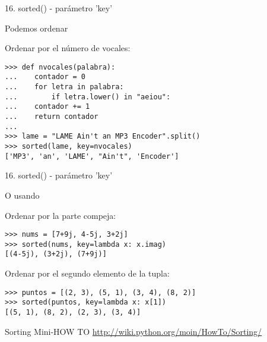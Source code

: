 \begin{frame}[fragile]{16. sorted() - parámetro 'key'}
  \begin{block}{}
    \centering
    Podemos ordenar 
  \end{block}

  \footnotesize
  \begin{exampleblock}
    {Ordenar por el número de vocales:}
    \begin{lstlisting}
>>> def nvocales(palabra):
...    contador = 0
...    for letra in palabra:
...        if letra.lower() in "aeiou":
...	   contador += 1
...    return contador
...
>>> lame = "LAME Ain't an MP3 Encoder".split()
>>> sorted(lame, key=nvocales)
['MP3', 'an', 'LAME', "Ain't", 'Encoder']
    \end{lstlisting}
  \end{exampleblock}
\end{frame}

\begin{frame}[fragile]{16. sorted() - parámetro 'key'}
  \begin{block}{}
    \centering
    O usando 
  \end{block}

  \footnotesize
  \begin{exampleblock}
    {Ordenar por la parte compeja:}
    \begin{lstlisting}
>>> nums = [7+9j, 4-5j, 3+2j]
>>> sorted(nums, key=lambda x: x.imag)
[(4-5j), (3+2j), (7+9j)]
    \end{lstlisting}
  \end{exampleblock}

  \begin{exampleblock}
    {Ordenar por el segundo elemento de la tupla:}
    \begin{lstlisting}
>>> puntos = [(2, 3), (5, 1), (3, 4), (8, 2)]
>>> sorted(puntos, key=lambda x: x[1])
[(5, 1), (8, 2), (2, 3), (3, 4)]
    \end{lstlisting}
  \end{exampleblock}

  \begin{block}
    {\centering Sorting Mini-HOW TO}
    \centering \url{http://wiki.python.org/moin/HowTo/Sorting/}
  \end{block}
\end{frame}
